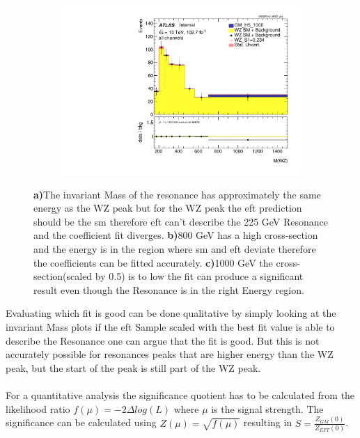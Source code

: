\documentclass[../Bachelorarbeit.tex]{subfiles}
\begin{document}
\begin{figure}[h]
\begin{subfigure}{0.3\textwidth}
        \caption{}
    \end{subfigure}
    \begin{subfigure}{0.3\textwidth}
        \includegraphics[width=\textwidth]{Plots/05x_for_comparision/VBSSR/all_VV_MWZ_vbs.pdf}
        \caption{}
    \end{subfigure}
    \caption{\textbf{a)}The invariant Mass of the resonance has approximately the same energy as the WZ peak but for the WZ peak the \acrshort{eft} prediction
        should be the \acrshort{sm} therefore \acrshort{eft} can't describe the 225 GeV Resonance and the coefficient fit diverges.
        \textbf{b)}800 GeV has a high cross-section and the energy is in the region where \acrshort{sm} and \acrshort{eft} deviate therefore the coefficients can be fitted accurately.
        \textbf{c)}1000 GeV the cross-section(scaled by 0.5) is to low the fit can produce a significant result even though the Resonance is in the right Energy region.}
    \label{fig:S1_with_fit_diffrence_225}
\end{figure}
Evaluating which fit is good can be done qualitative by simply looking at the invariant Mass plots if the \acrshort{eft} Sample scaled with the best fit value is able to describe
the Resonance one can argue that the fit is good. But this is not accurately possible for resonances peaks that are higher energy than the WZ peak, but the start of the peak is still part of the WZ peak.\\\\
For a quantitative analysis the significance quotient has to be calculated from the likelihood ratio $f(\mu)=-2\Delta log(L)$ where $\mu$ is the signal strength.
The significance can be calculated using $Z(\mu)=\sqrt{f(\mu)}$ resulting in $S = \frac{Z_{GM}(0)}{Z_{EFT}(0)}$.
\end{document}
